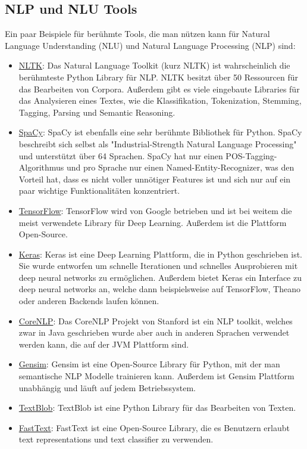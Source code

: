 \subsection{NLP und NLU Tools}

Ein paar Beispiele für berühmte Tools, die man nützen kann für Natural Language Understanding (NLU) und Natural Language Processing (NLP) sind:

\begin{itemize}
    \item \href{https://www.nltk.org/}{NLTK}: Das Natural Language Toolkit (kurz NLTK) ist wahrscheinlich die berühmteste Python Library für NLP. NLTK besitzt über 50 Ressourcen für das Bearbeiten von Corpora.
    Außerdem gibt es viele eingebaute Libraries für das Analysieren eines Textes, wie die Klassifikation, Tokenization, Stemming, Tagging, Parsing und Semantic Reasoning.
    \item \href{https://spacy.io/}{SpaCy}: SpaCy ist ebenfalls eine sehr berühmte Bibliothek für Python.
    SpaCy beschreibt sich selbst als "Industrial-Strength Natural Language Processing" und unterstützt über 64 Sprachen.
    SpaCy hat nur einen POS-Tagging-Algorithmus und pro Sprache nur einen Named-Entity-Recognizer, was den Vorteil hat, dass es nicht voller unnötiger Features ist und sich nur auf ein paar wichtige Funktionalitäten konzentriert.
    \item \href{https://www.tensorflow.org/}{TensorFlow}: TensorFlow wird von Google betrieben und ist bei weitem die meist verwendete Library für Deep Learning.
    Außerdem ist die Plattform Open-Source.
    \item \href{https://keras.io/}{Keras}: Keras ist eine Deep Learning Plattform, die in Python geschrieben ist.
    Sie wurde entworfen um schnelle Iterationen und schnelles Ausprobieren mit deep neural networks zu ermöglichen.
    Außerdem bietet Keras ein Interface zu deep neural networks an, welche dann beispielsweise auf TensorFlow, Theano oder anderen Backends laufen können.
    \item \href{https://stanfordnlp.github.io/CoreNLP/}{CoreNLP}: Das CoreNLP Projekt von Stanford ist ein NLP toolkit, welches zwar in Java geschrieben wurde aber auch in anderen Sprachen verwendet werden kann, die auf der JVM Plattform sind.
    \item \href{https://radimrehurek.com/gensim/}{Gensim}: Gensim ist eine Open-Source Library für Python, mit der man semantische NLP Modelle trainieren kann.
    Außerdem ist Gensim Plattform unabhängig und läuft auf jedem Betriebssystem.
    \item \href{https://textblob.readthedocs.io/en/dev/}{TextBlob}: TextBlob ist eine Python Library für das Bearbeiten von Texten.
    \item \href{https://fasttext.cc/}{FastText}: FastText ist eine Open-Source Library, die es Benutzern erlaubt text representations und text classifier zu verwenden.
\end{itemize}


